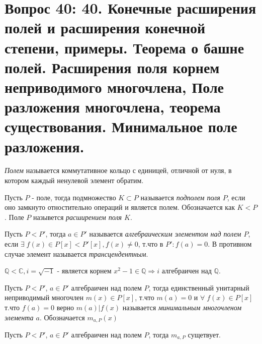 \section{Вопрос 40: 40.	Конечные расширения полей и расширения конечной степени, примеры. Теорема о башне полей. Расширения поля корнем неприводимого многочлена, Поле разложения многочлена, теорема существования. Минимальное поле разложения.
}

\begin{defs}[Поле]
  \textit{Полем} называется коммутативное кольцо с единицей, отличной от нуля, в котором каждый ненулевой элемент обратим.
\end{defs}

\begin{defs}[Подполе]
  Пусть $P$ - поле, тогда подмножество $K \subset P$ называется \textit{подполем поля $P$}, если оно замкнуто отностительно операций и является полем.
  Обозначается как $K < P$.
  Поле $P$ назывется \textit{расширением поля $K$}.
\end{defs}

\begin{defs}
  Пусть $P < P'$, тогда $a \in P'$ называется \textit{алгебраическим элементом над полем $P$}, если $\exists\; f(x) \in P[x] < P'[x], f(x) \neq 0$, т.что в $P':f(a) = 0$. В противном случае элемент называется \textit{трансцендентным}.
\end{defs}

\begin{example}
    $\mathbb{Q}<\mathbb{C}, i = \sqrt{-1}$ - является корнем $x^2 - 1 \in \mathbb{Q} \Rightarrow i$ алгебраичен над $\mathbb{Q}$.
\end{example}

\begin{defs}
  Пусть $P < P'$,  $a \in P'$ алгебраичен над полем $P$, тогда единственный унитарный неприводимый многочлен
  $m(x) \in P[x]$, т.что $ m(a) = 0$ и $\forall \; f(x) \in P[x]$ т.что $f(a) = 0 $ верно $m(a) | f(x) $ называется \textit{минимальным многочленом элемента $a$}.
  Обозначается $m_{a,P}(x)$
\end{defs}

\begin{proofs}
	Пусть $P < P'$,  $a \in P'$ алгебраичен над полем $P$, тогда $m_{a,P}$ сущетвует.
\end{proofs}


